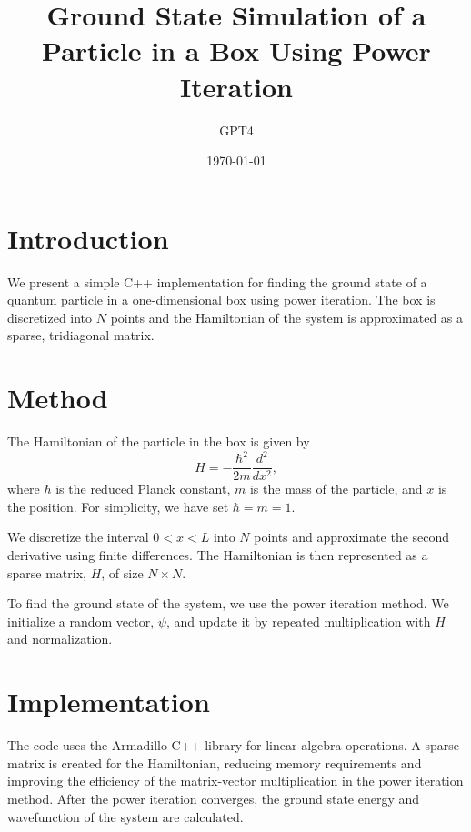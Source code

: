 \documentclass{article}
\begin{document}
\title{Ground State Simulation of a Particle in a Box Using Power Iteration}
\author{GPT4}
\date{\today}
\maketitle

\section{Introduction}
We present a simple C++ implementation for finding the ground state of
a quantum particle in a one-dimensional box using power iteration. The
box is discretized into $N$ points and the Hamiltonian of the system
is approximated as a sparse, tridiagonal matrix.

\section{Method}
The Hamiltonian of the particle in the box is given by
\begin{equation}
H = -\frac{{\hbar}^2}{2m} \frac{d^2}{dx^2},
\end{equation}
where $\hbar$ is the reduced Planck constant, $m$ is the mass of the
particle, and $x$ is the position. For simplicity, we have set $\hbar
= m = 1$.

We discretize the interval $0 < x < L$ into $N$ points and approximate
the second derivative using finite differences. The Hamiltonian is
then represented as a sparse matrix, $H$, of size $N \times N$.

To find the ground state of the system, we use the power iteration
method. We initialize a random vector, $\psi$, and update it by
repeated multiplication with $H$ and normalization.

\section{Implementation}
The code uses the Armadillo C++ library for linear algebra
operations. A sparse matrix is created for the Hamiltonian, reducing
memory requirements and improving the efficiency of the matrix-vector
multiplication in the power iteration method. After the power
iteration converges, the ground state energy and wavefunction of the
system are calculated.
\end{document}
